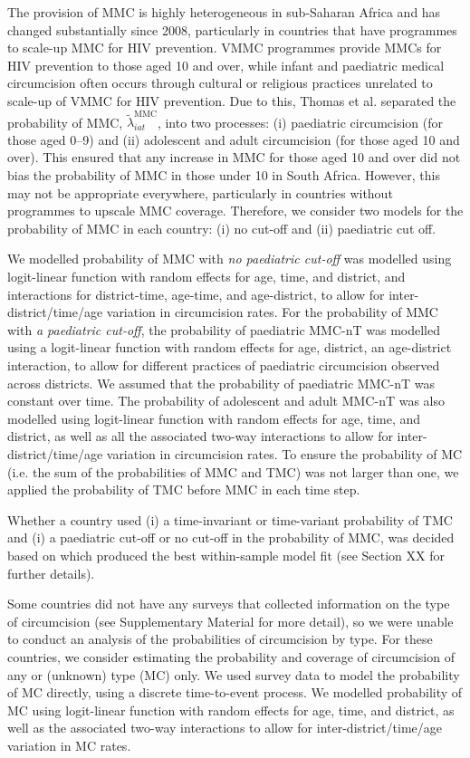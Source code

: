 \documentclass{article}
\begin{document}
The provision of MMC is highly heterogeneous in sub-Saharan Africa and has changed substantially since 2008, particularly in countries that have programmes to scale-up MMC for HIV prevention. VMMC programmes provide MMCs for HIV prevention to those aged 10 and over, while infant and paediatric medical circumcision often occurs through cultural or religious practices unrelated to scale-up of VMMC for HIV prevention. Due to this, Thomas et al. \cite{thomas2021multilevel} separated the probability of MMC, $\tilde{\lambda}^{\text{MMC}}_{iat}$, into two processes: (i) paediatric circumcision (for those aged 0--9) and (ii) adolescent and adult circumcision (for those aged 10 and over). This ensured that any increase in MMC for those aged 10 and over did not bias the probability of MMC in those under 10 in South Africa. However, this may not be appropriate everywhere, particularly in countries without programmes to upscale MMC coverage. Therefore, we consider two models for the probability of MMC in each country: (i) no cut-off and (ii) paediatric cut off.

We modelled probability of MMC with {\it no paediatric cut-off} was modelled using logit-linear function with random effects for age, time, and district, and interactions for district-time, age-time, and age-district, to allow for inter-district/time/age variation in circumcision rates. For the probability of MMC with {\it a paediatric cut-off}, the probability of paediatric MMC-nT was modelled using a logit-linear function with random effects for age, district, an age-district interaction, to allow for different practices of paediatric circumcision observed across districts. We assumed that the probability of paediatric MMC-nT was constant over time. The probability of adolescent and adult MMC-nT was also modelled using logit-linear function with random effects for age, time, and district, as well as all the associated two-way interactions to allow for inter-district/time/age variation in circumcision rates. To ensure the probability of MC (i.e. the sum of the probabilities of MMC and TMC) was not larger than one, we applied the probability of TMC before MMC in each time step.

Whether a country used (i) a time-invariant or time-variant probability of TMC and (i) a paediatric cut-off or no cut-off in the probability of MMC, was decided based on which produced the best within-sample model fit (see Section XX for further details). 

Some countries did not have any surveys that collected information on the type of circumcision (see Supplementary Material for more detail), so we were unable to conduct an analysis of the probabilities of circumcision by type. For these countries, we consider estimating the probability and coverage of circumcision of any or (unknown) type (MC) only. We used survey data to model the probability of MC directly, using a discrete time-to-event process. We modelled probability of MC using logit-linear function with random effects for age, time, and district, as well as the associated two-way interactions to allow for inter-district/time/age variation in MC rates. 
\end{document}
